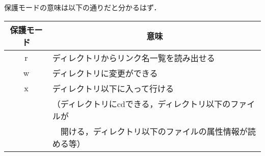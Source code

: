 \documentclass[a4j,twcolumn,11pt,nomag]{ltjarticle}      %
\begin{document}
\begin{enumerate}
\begin{enumerate}
保護モードの意味は以下の通りだと分かるはず．

\begin{tabular}{c | l}
\hline\hline
保護モード & \multicolumn{1}{|c}{意味} \\\hline
r & ディレクトリからリンク名一覧を読み出せる \\
w & ディレクトリに変更ができる               \\
x & ディレクトリ以下に入って行ける           \\
  & （ディレクトリにcdできる，ディレクトリ以下のファイルが \\
  & 　開ける，ディレクトリ以下のファイルの属性情報が読める等） \\
\end{tabular}

\end{enumerate}
\end{enumerate}
\end{document}
